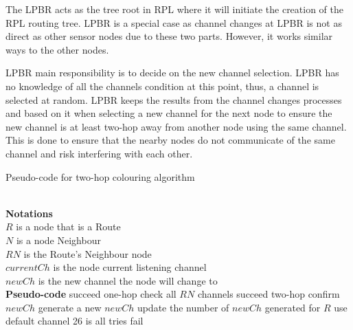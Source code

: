 The LPBR acts as the tree root in RPL where it will initiate the creation of the RPL routing tree. LPBR is a special case as channel changes at LPBR is not as direct as other sensor nodes due to these two parts. However, it works similar ways to the other nodes.



LPBR main responsibility is to decide on the new channel selection. LPBR has no knowledge of all the channels condition at this point, thus, a channel is selected at random. LPBR keeps the results from the channel changes processes and based on it when selecting a new channel for the next node to ensure the new channel is at least two-hop away from another node using the same channel. This is done to ensure that the nearby nodes do not communicate of the same channel and risk interfering with each other.

\begin{algorithm}
\caption{Pseudo-code for two-hop colouring algorithm}
\label{twohop_algo}
\begin{algorithmic}[]
\\\textbf{Notations}
\\$R$ is a node that is a Route
\\$N$ is a node Neighbour
\\$RN$ is the Route's Neighbour node
\\$currentCh$ is the node current listening channel
\\$newCh$ is the new channel the node will change to
\\\textbf{Pseudo-code}
		\State succeed one-hop
		\State check all $RN$ channels
			\State succeed two-hop
			\State confirm $newCh$
		\EndIf
	\Else
		\State generate a new $newCh$
		\State update the number of $newCh$ generated for $R$
		\State use default channel 26 is all tries fail
	\EndIf
\end{algorithmic}
\end{algorithm}

